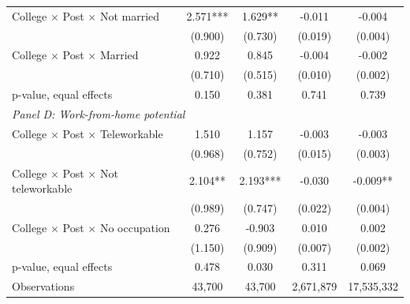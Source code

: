 \begin{tabular*}{\textwidth}{@{\extracolsep{\fill}}l*{4}{c}@{}}
College $\times$ Post $\times$ Not married&       2.571***&       1.629** &      -0.011   &      -0.004   \\
            &     (0.900)   &     (0.730)   &     (0.019)   &     (0.004)   \\
[1em]
College $\times$ Post $\times$ Married&       0.922   &       0.845   &      -0.004   &      -0.002   \\
            &     (0.710)   &     (0.515)   &     (0.010)   &     (0.002)   \\

p-value, equal effects&       0.150   &       0.381   &       0.741   &       0.739   \\
\midrule
\multicolumn{5}{l}{\textit{Panel D: Work-from-home potential}}\\[0.3em]

College $\times$ Post $\times$ Teleworkable&       1.510   &       1.157   &      -0.003   &      -0.003   \\
            &     (0.968)   &     (0.752)   &     (0.015)   &     (0.003)   \\
[1em]
College $\times$ Post $\times$ Not teleworkable&       2.104** &       2.193***&      -0.030   &      -0.009** \\
            &     (0.989)   &     (0.747)   &     (0.022)   &     (0.004)   \\
[1em]
College $\times$ Post $\times$ No occupation&       0.276   &      -0.903   &       0.010   &       0.002   \\
            &     (1.150)   &     (0.909)   &     (0.007)   &     (0.002)   \\

p-value, equal effects&       0.478   &       0.030   &       0.311   &       0.069   \\
Observations&      43,700   &      43,700   &   2,671,879   &  17,535,332   \\
\bottomrule
\end{tabular*}
